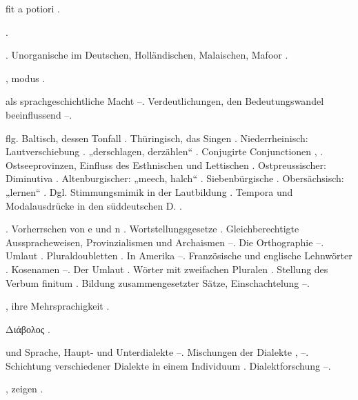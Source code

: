 \begin{register}
 fit a potiori \pageref{sp.56}.

 \pageref{sp.102}.

 \pageref{sp.36}. Unorganische im Deutschen, Holländischen, Malaischen, Mafoor \pageref{sp.201}.

, modus \pageref{sp.114}.

 als sprachgeschichtliche Macht \pageref{sp.181}–\pageref{sp.185}. Verdeutlichungen, den Bedeutungswandel beeinflussend \pageref{sp.239}–\pageref{sp.243}.

 \pageref{sp.284} flg. Baltisch, dessen Tonfall \pageref{sp.34}. Thüringisch, das Singen \pageref{sp.34}. Niederrheinisch: Lautverschiebung \pageref{sp.189}. „derschlagen, derzählen“ \pageref{sp.201}. Conjugirte Conjunctionen \pageref{sp.214}, \pageref{sp.398}. Ostseeprovinzen, Einfluss des Esthnischen und Lettischen \pageref{sp.269}. Ostpreussischer: Diminutiva \pageref{sp.218}. Altenburgischer: „meech, halch“ \pageref{sp.284}. Siebenbürgische \pageref{sp.286}. Obersächsisch: „lernen“ \pageref{sp.316}. Dgl. Stimmungsmimik in der Lautbildung \pageref{sp.378}. Tempora und Modalausdrücke in den süddeutschen D. \pageref{sp.431}.

. Vorherrschen von e und n \pageref{sp.34}. Wortstellungsgesetze \pageref{sp.63}. Gleichberechtigte Ausspracheweisen, Provinzialismen und Archaismen \pageref{sp.125}–\pageref{sp.127}. Die Orthographie \pageref{sp.132}–\pageref{sp.133}. Umlaut \pageref{sp.199}. Pluraldoubletten \pageref{sp.254}. In Amerika \pageref{sp.261}–\pageref{sp.262}. Französische und englische Lehnwörter \pageref{sp.264}. Kosenamen \pageref{sp.277}–\pageref{sp.278}. Der Umlaut \pageref{sp.401}. Wörter mit zweifachen Pluralen \pageref{sp.444}. Stellung des Verbum finitum \pageref{sp.429}. Bildung zusammengesetzter Sätze, Einschachtelung \pageref{sp.467}–\pageref{sp.469}.

, ihre Mehrsprachigkeit \pageref{sp.70}.


Διάβολος \pageref{sp.230}.

 und Sprache, Haupt- und Unterdialekte \pageref{sp.54}–\pageref{sp.58}. Mischungen der Dialekte \pageref{sp.177}, \pageref{sp.273}–\pageref{sp.277}. Schichtung verschiedener Dialekte in einem Individuum \pageref{sp.269}. Dialektforschung \pageref{sp.283}–\pageref{sp.287}.

, zeigen \pageref{sp.163}.


\end{register}
